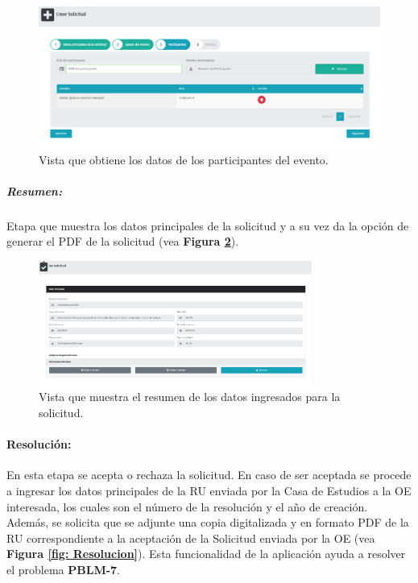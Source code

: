     \begin{figure}[htbp]
        \centering
        \includegraphics[width= 1\textwidth]{Imagenes/AgregarPersonas.PNG}
        \caption{\label{fig: Personas}Vista que obtiene los datos de los participantes del evento.}
    \end{figure}

    \subparagraph{\emph{Resumen: }} Etapa que muestra los datos principales de la solicitud y a su vez da la opción de generar el PDF de la solicitud (vea \textbf{Figura \ref{fig: ResumenSolicitud}}).

    \begin{figure}[htbp]
        \centering
        \includegraphics[width= 0.8\textwidth]{Imagenes/Resumen.PNG}
        \caption{\label{fig: ResumenSolicitud}Vista que muestra el resumen de los datos ingresados para la solicitud.}
    \end{figure}

\paragraph{Resolución: } En esta etapa se acepta o rechaza la solicitud. En caso de ser aceptada se procede a ingresar los datos principales de la RU enviada por la Casa de Estudios a la OE interesada, los cuales son el número de la resolución y el año de creación. Además, se solicita que se adjunte una copia digitalizada y en formato PDF de la RU correspondiente a la aceptación de la Solicitud enviada por la OE (vea \textbf{Figura \ref{fig: Resolucion}}). Esta funcionalidad de la aplicación ayuda a resolver el problema \textbf{PBLM-7}.

